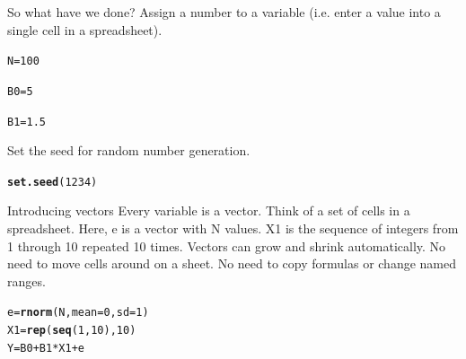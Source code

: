 \documentclass[xcolor=dvipsnames]{beamer}
\makeatletter
\newcommand{\hlnum}[1]{\textcolor[rgb]{0.686,0.059,0.569}{#1}}%
\newcommand{\hlopt}[1]{\textcolor[rgb]{0,0,0}{#1}}%
\newcommand{\hlstd}[1]{\textcolor[rgb]{0.345,0.345,0.345}{#1}}%
\newcommand{\hlkwb}[1]{\textcolor[rgb]{0.69,0.353,0.396}{#1}}%
\newcommand{\hlkwc}[1]{\textcolor[rgb]{0.333,0.667,0.333}{#1}}%
\newcommand{\hlkwd}[1]{\textcolor[rgb]{0.737,0.353,0.396}{\textbf{#1}}}%
\newenvironment{kframe}{%
 \def\at@end@of@kframe{}%
 \ifinner\ifhmode%
  \def\at@end@of@kframe{\end{minipage}}%
  \begin{minipage}{\columnwidth}%
 \fi\fi%
 \def\FrameCommand##1{\hskip\@totalleftmargin \hskip-\fboxsep
 \colorbox{shadecolor}{##1}\hskip-\fboxsep
     \hskip-\linewidth \hskip-\@totalleftmargin \hskip\columnwidth}%
 \MakeFramed {\advance\hsize-\width
   \@totalleftmargin\z@ \linewidth\hsize
   \@setminipage}}%
 {\par\unskip\endMakeFramed%
 \at@end@of@kframe}
\newenvironment{knitrout}{}{} %
\makeatother
\begin{document}
\begin{frame}[fragile]{So what have we done?}
Assign a number to a variable (i.e. enter a value into a single cell in a spreadsheet).
\begin{knitrout}
\color{fgcolor}\begin{kframe}
\begin{alltt}
\hlstd{N} \hlkwb{=} \hlnum{100}

\hlstd{B0} \hlkwb{=} \hlnum{5}

\hlstd{B1} \hlkwb{=} \hlnum{1.5}
\end{alltt}
\end{kframe}
\end{knitrout}

\end{frame}

\begin{frame}[fragile]
Set the seed for random number generation.
\begin{knitrout}
\color{fgcolor}\begin{kframe}
\begin{alltt}
\hlkwd{set.seed}\hlstd{(}\hlnum{1234}\hlstd{)}
\end{alltt}
\end{kframe}
\end{knitrout}

\end{frame}

\begin{frame}[fragile]{Introducing vectors}
Every variable is a vector. Think of a set of cells in a spreadsheet. Here, e is a vector with N values. X1 is the sequence of integers from 1 through 10 repeated 10 times. Vectors can grow and shrink automatically. No need to move cells around on a sheet. No need to copy formulas or change named ranges.
\begin{knitrout}
\color{fgcolor}\begin{kframe}
\begin{alltt}
\hlstd{e} \hlkwb{=} \hlkwd{rnorm}\hlstd{(N,} \hlkwc{mean} \hlstd{=} \hlnum{0}\hlstd{,} \hlkwc{sd} \hlstd{=} \hlnum{1}\hlstd{)}
\hlstd{X1} \hlkwb{=} \hlkwd{rep}\hlstd{(}\hlkwd{seq}\hlstd{(}\hlnum{1}\hlstd{,} \hlnum{10}\hlstd{),} \hlnum{10}\hlstd{)}
\hlstd{Y} \hlkwb{=} \hlstd{B0} \hlopt{+} \hlstd{B1} \hlopt{*} \hlstd{X1} \hlopt{+} \hlstd{e}
\end{alltt}
\end{kframe}
\end{knitrout}

\end{frame}
\end{document}
